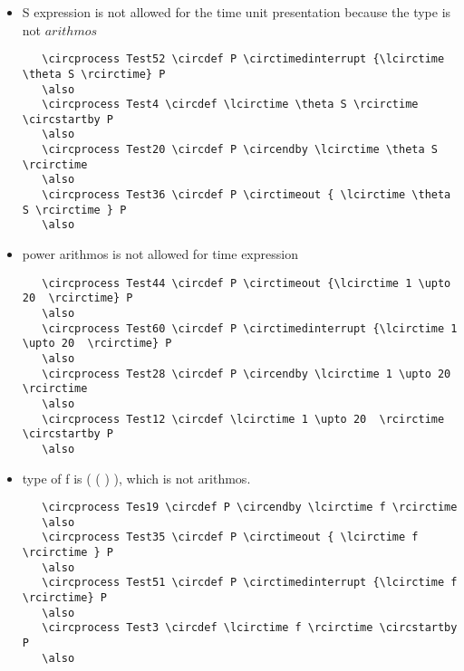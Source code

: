 \documentclass{article}
\begin{document}
\begin{itemize}
\item \theta S expression is not allowed for the time unit presentation because the type is not $arithmos$

\begin{verbatim}
   \circprocess Test52 \circdef P \circtimedinterrupt {\lcirctime \theta S \rcirctime} P
   \also
   \circprocess Test4 \circdef \lcirctime \theta S \rcirctime \circstartby P
   \also
   \circprocess Test20 \circdef P \circendby \lcirctime \theta S \rcirctime
   \also
   \circprocess Test36 \circdef P \circtimeout { \lcirctime \theta S \rcirctime } P
   \also
\end{verbatim}

\item  power arithmos is not allowed for time expression

\begin{verbatim}
   \circprocess Test44 \circdef P \circtimeout {\lcirctime 1 \upto 20  \rcirctime} P
   \also
   \circprocess Test60 \circdef P \circtimedinterrupt {\lcirctime 1 \upto 20  \rcirctime} P
   \also
   \circprocess Test28 \circdef P \circendby \lcirctime 1 \upto 20  \rcirctime
   \also
   \circprocess Test12 \circdef \lcirctime 1 \upto 20  \rcirctime \circstartby P
   \also
\end{verbatim}

\item type of f is \power ( \arithmos \cross ( \arithmos \cross \arithmos ) ), which is not arithmos. 
    
\begin{verbatim}
   \circprocess Tes19 \circdef P \circendby \lcirctime f \rcirctime
   \also
   \circprocess Test35 \circdef P \circtimeout { \lcirctime f \rcirctime } P
   \also
   \circprocess Test51 \circdef P \circtimedinterrupt {\lcirctime f \rcirctime} P
   \also
   \circprocess Test3 \circdef \lcirctime f \rcirctime \circstartby P
   \also
\end{verbatim}
\end{itemize}
\end{document}
